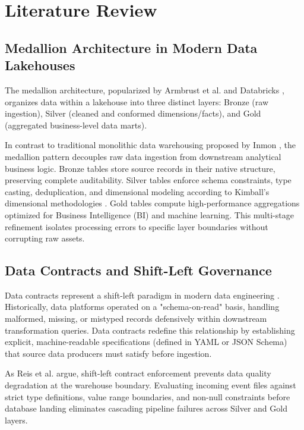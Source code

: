 \documentclass[12pt, a4paper]{report}
\begin{document}
\chapter{Literature Review}
\label{chap:litreview}

\section{Medallion Architecture in Modern Data Lakehouses}
The medallion architecture, popularized by Armbrust et al. \cite{armbrust_lakehouse} and Databricks \cite{databricks_medallion}, organizes data within a lakehouse into three distinct layers: Bronze (raw ingestion), Silver (cleaned and conformed dimensions/facts), and Gold (aggregated business-level data marts).

In contrast to traditional monolithic data warehousing proposed by Inmon \cite{inmon_dw}, the medallion pattern decouples raw data ingestion from downstream analytical business logic. Bronze tables store source records in their native structure, preserving complete auditability. Silver tables enforce schema constraints, type casting, deduplication, and dimensional modeling according to Kimball's dimensional methodologies \cite{kimball_dwtoolkit}. Gold tables compute high-performance aggregations optimized for Business Intelligence (BI) and machine learning. This multi-stage refinement isolates processing errors to specific layer boundaries without corrupting raw assets.

\section{Data Contracts and Shift-Left Governance}
Data contracts represent a shift-left paradigm in modern data engineering \cite{data_contracts_guide, dbt_contracts}. Historically, data platforms operated on a "schema-on-read" basis, handling malformed, missing, or mistyped records defensively within downstream transformation queries. Data contracts redefine this relationship by establishing explicit, machine-readable specifications (defined in YAML or JSON Schema) that source data producers must satisfy before ingestion.

As Reis et al. \cite{data_contracts_guide} argue, shift-left contract enforcement prevents data quality degradation at the warehouse boundary. Evaluating incoming event files against strict type definitions, value range boundaries, and non-null constraints before database landing eliminates cascading pipeline failures across Silver and Gold layers.
\end{document}

